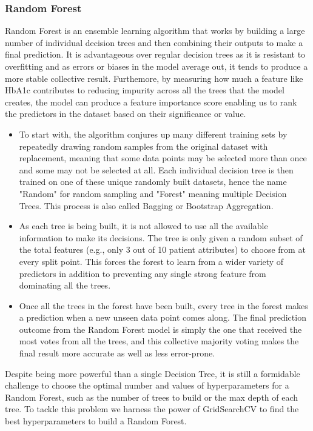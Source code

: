 	\subsubsection{Random Forest}
	Random Forest is an ensemble learning algorithm that works by building a large number of individual decision trees and then combining their outputs to make a final prediction. It is advantageous over regular decision trees as it is resistant to overfitting and as errors or biases in the model average out, it tends to produce a more stable collective result. Furthemore, by measuring how much a feature like HbA1c contributes to reducing impurity across all the trees that the model creates, the model can produce a feature importance score enabling us to rank the predictors in the dataset based on their significance or value.
	\begin{itemize}
		\item To start with, the algorithm conjures up many different training sets by repeatedly drawing random samples from the original dataset with replacement, meaning that some data points may be selected more than once and some may not be selected at all. Each individual decision tree is then trained on one of these unique randomly built datasets, hence the name "Random" for random sampling and "Forest" meaning multiple Decision Trees. This process is also called Bagging or Bootstrap Aggregation.
		\item As each tree is being built, it is not allowed to use all the available information to make its decisions. The tree is only given a random subset of the total features (e.g., only 3 out of 10 patient attributes) to choose from at every split point. This forces the forest to learn from a wider variety of predictors in addition to preventing any single strong feature from dominating all the trees.
		\item Once all the trees in the forest have been built, every tree in the forest makes a prediction when a new unseen data point comes along. The final prediction outcome from the Random Forest model is simply the one that received the most votes from all the trees, and this collective majority voting makes the final result more accurate as well as less error-prone. 
	\end{itemize}

	\vspace{5pt}
	\noindent Despite being more powerful than a single Decision Tree, it is still a formidable challenge to choose the optimal number and values of hyperparameters for a Random Forest, such as the number of trees to build or the max depth of each tree. To tackle this problem we harness the power of GridSearchCV to find the best hyperparameters to build a Random Forest.
	
